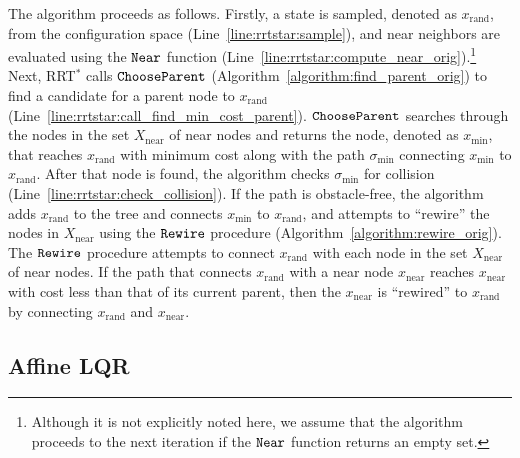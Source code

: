 \documentclass[letterpaper, 10pt, english, conference]{IEEEtran}
\begin{document}
The algorithm proceeds as follows.
Firstly, a state is sampled, denoted as
$x_\mathrm{rand}$, from the configuration space
(Line~\ref{line:rrtstar:sample}), and near neighbors are evaluated
using the ${\tt Near}$ function
(Line~\ref{line:rrtstar:compute_near_orig}).\footnote{Although it is not
  explicitly noted here,
 we assume that the algorithm proceeds to
  the next iteration if the ${\tt Near}$ function returns an empty
  set.} Next, RRT$^*$ calls ${\tt ChooseParent}$
(Algorithm~\ref{algorithm:find_parent_orig}) to find a candidate for a
parent node to $x_\mathrm{rand}$
(Line~\ref{line:rrtstar:call_find_min_cost_parent}). ${\tt
ChooseParent}$ searches through the nodes in the set
$X_\mathrm{near}$ of near nodes and returns the node, denoted as
$x_\mathrm{min}$, that reaches $x_\mathrm{rand}$ with minimum cost
along with the path $\sigma_\mathrm{min}$ connecting
$x_\mathrm{min}$ to $x_\mathrm{rand}$. After that node
is found, the algorithm checks $\sigma_\mathrm{min}$ for collision
(Line~\ref{line:rrtstar:check_collision}). If the path
is obstacle-free,
the algorithm adds
$x_\mathrm{rand}$ to the tree and connects $x_\mathrm{min}$ to
$x_\mathrm{rand}$, and attempts to ``rewire'' the nodes in
$X_\mathrm{near}$ using the ${\tt Rewire}$ procedure
(Algorithm~\ref{algorithm:rewire_orig}). The ${\tt Rewire}$
procedure attempts to connect $x_\mathrm{rand}$ with each node in the
set $X_\mathrm{near}$ of near nodes. If the path that connects
$x_\mathrm{rand}$ with a near node $x_\mathrm{near}$ reaches
$x_\mathrm{near}$ with cost less than that of its current parent, then
the $x_\mathrm{near}$ is ``rewired'' to $x_\mathrm{rand}$ by
connecting $x_\mathrm{rand}$ and $x_\mathrm{near}$.

\subsection{Affine LQR}
\label{sect:affine_lqr}
\end{document}

